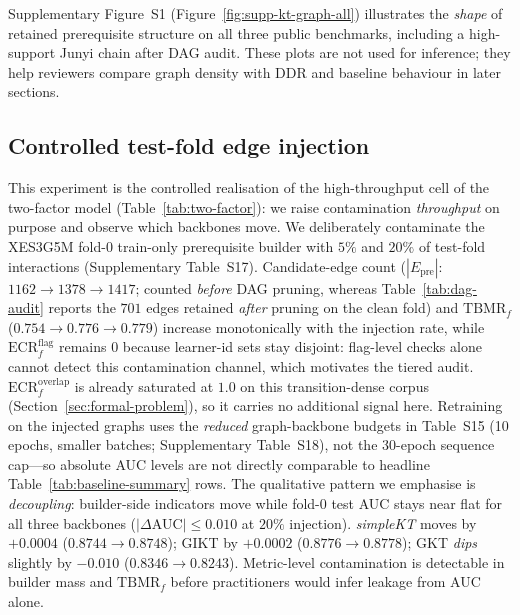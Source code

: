 \documentclass[pdflatex,sn-mathphys-num]{sn-jnl}
\newcommand{\Epre}{\ensuremath{E_{\text{pre}}}}
\newcommand{\DDR}{\textsc{DDR}}
\begin{document}
Supplementary Figure~S1 (Figure~\ref{fig:supp-kt-graph-all}) illustrates the
\emph{shape} of retained prerequisite structure on all three public benchmarks,
including a high-support Junyi chain after DAG audit. These plots are not used
for inference; they help reviewers compare graph density with \DDR{} and
baseline behaviour in later sections.

\subsection{Controlled test-fold edge injection}
\label{sec:exp-injection}
This experiment is the controlled realisation of the high-throughput cell of
the two-factor model (Table~\ref{tab:two-factor}): we raise contamination
\emph{throughput} on purpose and observe which backbones move. We
deliberately contaminate the XES3G5M fold-0 train-only prerequisite builder
with $5\%$ and $20\%$ of test-fold interactions (Supplementary Table~S17).
Candidate-edge count ($|\Epre|$: $1162{\to}1378{\to}1417$; counted
\emph{before} DAG pruning, whereas Table~\ref{tab:dag-audit} reports the
$701$ edges retained \emph{after} pruning on the clean fold) and
$\mathrm{TBMR}_f$ ($0.754{\to}0.776{\to}0.779$) increase monotonically with
the injection rate, while $\mathrm{ECR}^{\mathrm{flag}}_f$ remains $0$
because learner-id sets stay disjoint: flag-level checks alone cannot detect
this contamination channel, which motivates the tiered audit.
$\mathrm{ECR}^{\mathrm{overlap}}_f$ is already saturated at $1.0$ on this
transition-dense corpus (Section~\ref{sec:formal-problem}), so it carries no
additional signal here. Retraining on the injected graphs uses the \emph{reduced}
graph-backbone budgets in Table~S15 (10 epochs, smaller batches; Supplementary
Table~S18), not the 30-epoch sequence cap---so absolute AUC levels are not
directly comparable to headline Table~\ref{tab:baseline-summary} rows. The
qualitative pattern we emphasise is \emph{decoupling}: builder-side indicators
move while fold-0 test AUC stays near flat for all three backbones
($|\Delta\text{AUC}|{\leq}0.010$ at $20\%$ injection). \textit{simpleKT} moves by ${+}0.0004$ ($0.8744{\to}0.8748$);
GIKT by ${+}0.0002$ ($0.8776{\to}0.8778$); GKT \emph{dips} slightly by
${-}0.010$ ($0.8346{\to}0.8243$). Metric-level contamination is detectable in
builder mass and $\mathrm{TBMR}_f$ before practitioners would infer leakage
from AUC alone.
\end{document}
